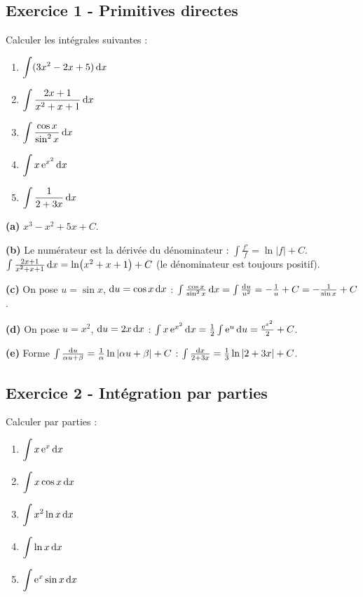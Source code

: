 \documentclass[12pt,a4paper]{article}
\begin{document}
\subsection*{Exercice 1 - Primitives directes \niveau{\facile}}

\begin{boiteexercice}
Calculer les intégrales suivantes :
\begin{enumerate}[label=(\alph*)]
  \item $\displaystyle\int(3x^2 - 2x + 5)\,\mathrm{d} x$
  \item $\displaystyle\int\frac{2x+1}{x^2+x+1}\,\mathrm{d} x$
  \item $\displaystyle\int\frac{\cos x}{\sin^2 x}\,\mathrm{d} x$
  \item $\displaystyle\int x\,\mathrm{e}^{x^2}\,\mathrm{d} x$
  \item $\displaystyle\int\frac{1}{2+3x}\,\mathrm{d} x$
\end{enumerate}
\end{boiteexercice}

\begin{boitecorrige}
\textbf{(a)} $x^3 - x^2 + 5x + C$.

\textbf{(b)} Le numérateur est la dérivée du dénominateur : $\int\frac{f'}{f} = \ln|f|+C$.
$\int\frac{2x+1}{x^2+x+1}\,\mathrm{d} x = \ln(x^2+x+1)+C$ (le dénominateur est toujours positif).

\textbf{(c)} On pose $u=\sin x$, $\mathrm{d} u=\cos x\,\mathrm{d} x$ :
$\int\frac{\cos x}{\sin^2 x}\,\mathrm{d} x = \int\frac{\mathrm{d} u}{u^2} = -\frac{1}{u}+C = -\frac{1}{\sin x}+C$.

\textbf{(d)} On pose $u=x^2$, $\mathrm{d} u=2x\,\mathrm{d} x$ :
$\int x\,\mathrm{e}^{x^2}\,\mathrm{d} x = \frac{1}{2}\int\mathrm{e}^u\,\mathrm{d} u = \frac{\mathrm{e}^{x^2}}{2}+C$.

\textbf{(e)} Forme $\int\frac{\mathrm{d} u}{\alpha u+\beta}=\frac{1}{\alpha}\ln|\alpha u+\beta|+C$ :
$\int\frac{\mathrm{d} x}{2+3x} = \frac{1}{3}\ln|2+3x|+C$.
\end{boitecorrige}

\subsection*{Exercice 2 - Intégration par parties \niveau{\moyen}}

\begin{boiteexercice}
Calculer par parties :
\begin{enumerate}[label=(\alph*)]
  \item $\displaystyle\int x\,\mathrm{e}^x\,\mathrm{d} x$
  \item $\displaystyle\int x\cos x\,\mathrm{d} x$
  \item $\displaystyle\int x^2\ln x\,\mathrm{d} x$
  \item $\displaystyle\int\ln x\,\mathrm{d} x$
  \item $\displaystyle\int\mathrm{e}^x\sin x\,\mathrm{d} x$
\end{enumerate}
\end{boiteexercice}
\end{document}
